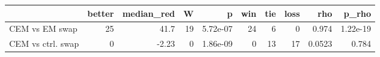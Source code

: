 \begin{tabular}{lrrrrrrrrr}
\toprule
 & better & median\_red & W & p & win & tie & loss & rho & p\_rho \\
\midrule
CEM vs EM swap & 25 & 41.7 & 19 & 5.72e-07 & 24 & 6 & 0 & 0.974 & 1.22e-19 \\
CEM vs ctrl. swap & 0 & -2.23 & 0 & 1.86e-09 & 0 & 13 & 17 & 0.0523 & 0.784 \\
\bottomrule
\end{tabular}
